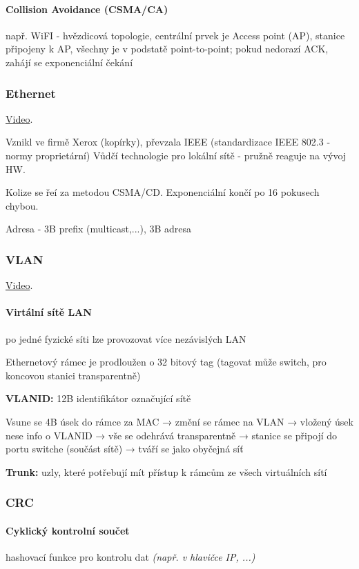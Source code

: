 \documentclass[10pt,a4paper]{article}
\begin{document}
\paragraph*{Collision Avoidance (CSMA/CA)} např. WiFI - hvězdicová topologie, centrální prvek je Access point (AP), stanice připojeny k AP, všechny je v podstatě point-to-point; pokud nedorazí ACK, zahájí se exponenciální čekání

\subsubsection{Ethernet}

\href{https://youtu.be/1SpY1vwEIJI}{Video}.

Vznikl ve firmě Xerox (kopírky), převzala IEEE (standardizace IEEE 802.3 - normy proprietární)
Vůdčí technologie pro lokální sítě - pružně reaguje na vývoj HW.

Kolize se řeí za metodou CSMA/CD. Exponenciální končí po 16 pokusech chybou.

Adresa - 3B prefix (multicast,...), 3B adresa

\subsubsection{VLAN}

\href{https://youtu.be/jC6MJTh9fRE}{Video}.
\paragraph*{Virtální sítě LAN} po jedné fyzické síti lze provozovat více nezávislých LAN

Ethernetový rámec je prodloužen o 32 bitový tag (tagovat může switch, pro koncovou stanici transparentně)

\textbf{VLANID:} 12B identifikátor označující sítě

Vsune se 4B úsek do rámce za MAC → změní se rámec na VLAN → vložený úsek nese info o VLANID → vše se odehrává transparentně → stanice se připojí do portu switche (součást sítě) → tváří se jako obyčejná síť

\textbf{Trunk:} uzly, které potřebují mít přístup k rámcům ze všech virtuálních sítí


\subsubsection{CRC}

\paragraph*{Cyklický kontrolní součet} hashovací funkce pro kontrolu dat \textit{(např. v hlavičce IP, ...)}
\end{document}
